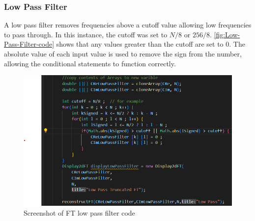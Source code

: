     \subsubsection{Low Pass Filter}
    A low pass filter removes frequencies above a cutoff value allowing low frequencies to pass through. In this instance, the cutoff was set to $N/8$ or $256/8$. \autoref{fig:Low-Pass-Filter-code} shows that any values greater than the cutoff are set to $0$. The absolute value of each input value is used to remove the sign from the number, allowing the conditional statements to function correctly. 
    
    \begin{figure}[H]
        \centering
        \includegraphics[width=0.8\columnwidth]{Figures/Week 1/W1-Low-Pass-Code.png}
        \caption{Screenshot of FT low pass filter code}
        \label{fig:Low-Pass-Filter-code}
      \end{figure}

